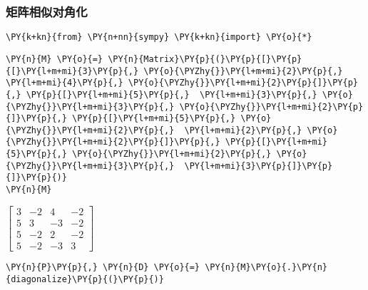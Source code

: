     \hypertarget{ux77e9ux9635ux76f8ux4f3cux5bf9ux89d2ux5316}{%
\subsubsection{矩阵相似对角化}\label{ux77e9ux9635ux76f8ux4f3cux5bf9ux89d2ux5316}}

    \begin{tcolorbox}[breakable, size=fbox, boxrule=1pt, pad at break*=1mm,colback=cellbackground, colframe=cellborder]
\begin{Verbatim}[commandchars=\\\{\}]
\PY{k+kn}{from} \PY{n+nn}{sympy} \PY{k+kn}{import} \PY{o}{*}
\end{Verbatim}
\end{tcolorbox}

    \begin{tcolorbox}[breakable, size=fbox, boxrule=1pt, pad at break*=1mm,colback=cellbackground, colframe=cellborder]
\begin{Verbatim}[commandchars=\\\{\}]
\PY{n}{M} \PY{o}{=} \PY{n}{Matrix}\PY{p}{(}\PY{p}{[}\PY{p}{[}\PY{l+m+mi}{3}\PY{p}{,} \PY{o}{\PYZhy{}}\PY{l+m+mi}{2}\PY{p}{,}  \PY{l+m+mi}{4}\PY{p}{,} \PY{o}{\PYZhy{}}\PY{l+m+mi}{2}\PY{p}{]}\PY{p}{,} \PY{p}{[}\PY{l+m+mi}{5}\PY{p}{,}  \PY{l+m+mi}{3}\PY{p}{,} \PY{o}{\PYZhy{}}\PY{l+m+mi}{3}\PY{p}{,} \PY{o}{\PYZhy{}}\PY{l+m+mi}{2}\PY{p}{]}\PY{p}{,} \PY{p}{[}\PY{l+m+mi}{5}\PY{p}{,} \PY{o}{\PYZhy{}}\PY{l+m+mi}{2}\PY{p}{,}  \PY{l+m+mi}{2}\PY{p}{,} \PY{o}{\PYZhy{}}\PY{l+m+mi}{2}\PY{p}{]}\PY{p}{,} \PY{p}{[}\PY{l+m+mi}{5}\PY{p}{,} \PY{o}{\PYZhy{}}\PY{l+m+mi}{2}\PY{p}{,} \PY{o}{\PYZhy{}}\PY{l+m+mi}{3}\PY{p}{,}  \PY{l+m+mi}{3}\PY{p}{]}\PY{p}{]}\PY{p}{)}
\PY{n}{M}
\end{Verbatim}
\end{tcolorbox}
 
            
    
    $\displaystyle \left[\begin{matrix}3 & -2 & 4 & -2\\5 & 3 & -3 & -2\\5 & -2 & 2 & -2\\5 & -2 & -3 & 3\end{matrix}\right]$

    

    \begin{tcolorbox}[breakable, size=fbox, boxrule=1pt, pad at break*=1mm,colback=cellbackground, colframe=cellborder]
\begin{Verbatim}[commandchars=\\\{\}]
\PY{n}{P}\PY{p}{,} \PY{n}{D} \PY{o}{=} \PY{n}{M}\PY{o}{.}\PY{n}{diagonalize}\PY{p}{(}\PY{p}{)}
\end{Verbatim}
\end{tcolorbox}

